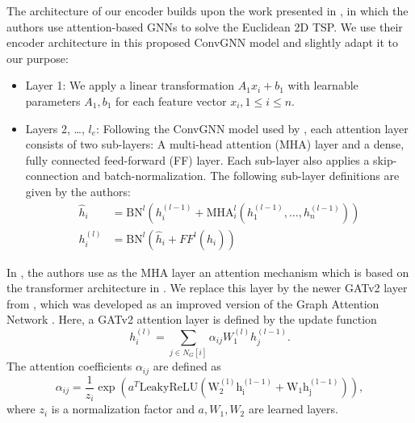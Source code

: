 \documentclass[draft,final]{vutinfth} %
\begin{document}


The architecture of our encoder builds upon the work presented in \cite{Kool2019}, in which the authors use attention-based GNNs to solve the Euclidean 2D TSP. We use their encoder architecture in this proposed ConvGNN model and slightly adapt it to our purpose:
\begin{itemize}
    \item Layer 1: We apply a linear transformation $A_1 x_i + b_1$ with learnable parameters $A_1, b_1$ for each feature vector $x_i, 1 \leq i \leq n$.
    \item Layers 2, \dots, $l_e$: Following the ConvGNN model used by \cite{Kool2019}, each attention layer consists of two sub-layers: A multi-head attention (MHA) layer and a dense, fully connected feed-forward (FF) layer. Each sub-layer also applies a skip-connection and batch-normalization. The following sub-layer definitions are given by the authors: 
    \begin{align*}
        \hat{h}_i &= \text{BN}^l(h_i^{(l-1)} + \text{MHA}_i^l (h_1^{(l-1)}, \dots , h_n^{(l-1)}) ) \\
        h_i^{(l)} &= \text{BN}^l(\hat{h}_i + FF^l(\hat{h}_i))
    \end{align*}
\end{itemize}
In \cite{Kool2019}, the authors use as the MHA layer an attention mechanism which is based on the transformer architecture in \cite{VaswaniSPUJGKP17}. We replace this layer by the newer GATv2 layer from \cite{Brody2021}, which was developed as an improved version of the Graph Attention Network \cite{Velickovic2018}. Here, a GATv2 attention layer is defined by the update function 
\[
    h_i^{(l)} = \sum_{j \in N_G[i]} \alpha_{ij} W_{1}^{(l)} h_j^{(l-1)}.    
\]
The attention coefficients $\alpha_{ij}$ are defined as 
\[
    \alpha_{ij} = \frac{1}{z_i} \exp(a^T \mathrm{LeakyReLU(W_2^{(l)}h_i^{(l-1)} + W_1 h_j^{(l-1)} )}),    
\]
where $z_i$ is a normalization factor and $a, W_1, W_2$ are learned layers. 
\end{document}
